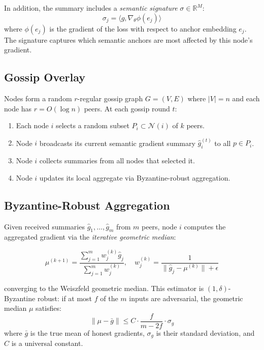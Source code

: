 \documentclass[11pt,a4paper]{article}
\begin{document}
In addition, the summary includes a \emph{semantic signature} $\sigma \in \mathbb{R}^M$:
\begin{equation}
    \sigma_j = \langle g, \nabla_\theta \phi(e_j) \rangle
    \label{eq:signature}
\end{equation}
where $\phi(e_j)$ is the gradient of the loss with respect to anchor embedding $e_j$.
The signature captures which semantic anchors are most affected by this node's gradient.

\subsection{Gossip Overlay}

Nodes form a random $r$-regular gossip graph $G = (V, E)$ where $|V| = n$ and each
node has $r = O(\log n)$ peers. At each gossip round $t$:

\begin{enumerate}
    \item Each node $i$ selects a random subset $P_i \subset \mathcal{N}(i)$ of $k$ peers.
    \item Node $i$ broadcasts its current semantic gradient summary $\hat{g}_i^{(t)}$
          to all $p \in P_i$.
    \item Node $i$ collects summaries from all nodes that selected it.
    \item Node $i$ updates its local aggregate via Byzantine-robust aggregation.
\end{enumerate}

\subsection{Byzantine-Robust Aggregation}

Given received summaries $\hat{g}_1, \ldots, \hat{g}_m$ from $m$ peers, node $i$
computes the aggregated gradient via the \emph{iterative geometric median}:

\begin{equation}
    \mu^{(k+1)} = \frac{\sum_{j=1}^{m} w_j^{(k)} \hat{g}_j}{\sum_{j=1}^{m} w_j^{(k)}},
    \quad w_j^{(k)} = \frac{1}{\|\hat{g}_j - \mu^{(k)}\| + \epsilon}
    \label{eq:geomed}
\end{equation}

converging to the Weiszfeld geometric median. This estimator is $(1, \delta)$-Byzantine
robust: if at most $f$ of the $m$ inputs are adversarial, the geometric median
$\mu$ satisfies:
\begin{equation}
    \|\mu - \bar{g}\| \leq C \cdot \frac{f}{m - 2f} \cdot \sigma_g
    \label{eq:robust_bound}
\end{equation}
where $\bar{g}$ is the true mean of honest gradients, $\sigma_g$ is their standard
deviation, and $C$ is a universal constant.
\end{document}
